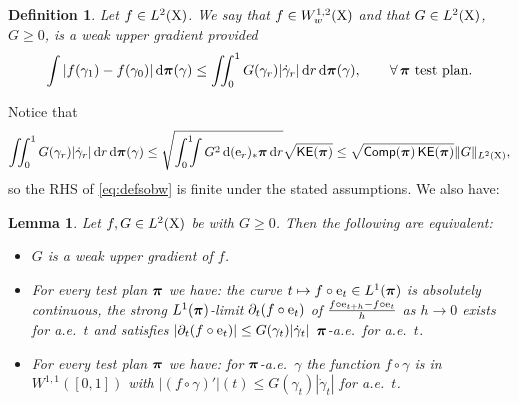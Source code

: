 \documentclass[11pt]{article}
\numberwithin{equation}{section}
\newtheorem{lemma}[theorem]{Lemma}
\newtheorem{definition}[theorem]{Definition}
\newcommand{\ppi}{{\mbox{\boldmath$\pi$}}}
\newcommand{\e}{{\rm e}}
\newcommand{\X}{{\rm X}}
\renewcommand{\d}{{\rm d}}
\newcommand{\comp}{{\sf Comp}} %
\newcommand\KE{{\sf KE}}
\begin{document}
\begin{definition}\label{def:defsobw} Let  $f\in L^2(\X)$. We say that $f\in W^{1,2}_w(\X)$ and that $G\in L^2(\X)$, $G\geq 0$, is a \emph{weak upper gradient} provided 
\begin{equation}
\label{eq:defsobw}
\int|f(\gamma_1)-f(\gamma_0)|\,\d\ppi(\gamma)\leq\iint_0^1 G(\gamma_r)|\dot\gamma_r|\,\d r\,\d\ppi(\gamma),\qquad\forall\,\ppi\text{ test plan}.
\end{equation}
\end{definition}
 Notice that
\begin{equation}
\label{eq:dappi}
\iint_0^1 G(\gamma_r)|\dot\gamma_r|\,\d r\,\d\ppi(\gamma)\leq \sqrt{ \int_0^1\!\!\! \int G^2\,\d(\e_r)_*\ppi\,\d r}\sqrt{\KE(\ppi)}\leq  \sqrt{\comp(\ppi)\,\KE(\ppi)}\|G\|_{L^2(\X)},
\end{equation}
so the RHS of \eqref{eq:defsobw} is finite under the stated assumptions. We also have:
\begin{lemma}\label{le:equivsobw} Let $f,G\in L^2(\X)$ be with $G\geq 0$.
Then the following are equivalent:
\begin{itemize}
\item[i)] $G$ is a weak upper gradient of $f$.
\item[ii)] For every test plan $\ppi$ we have: the curve $t\mapsto f\circ\e_t\in L^1(\ppi)$ is absolutely continuous, the strong $L^1(\ppi)$-limit $\partial_t(f\circ \e_t)$ of $\frac{f\circ\e_{t+h}-f\circ\e_t}{h}$ as $h\to 0$ exists for a.e.\ $t$ and satisfies   $|\partial_t(f\circ\e_t)|\leq G(\gamma_t)|\dot\gamma_t|$ $\ppi$-a.e.\ for a.e.\ $t$.
\item[iii)] For every test plan $\ppi$ we have: for $\ppi$-a.e.\ $\gamma$ the function $f\circ \gamma$ is in $W^{1,1}([0,1])$ with $|(f\circ \gamma)'|(t)\leq G(\gamma_t)|\dot\gamma_t|$ for a.e.\ $t$.
\end{itemize}
\end{lemma}
\end{document}
